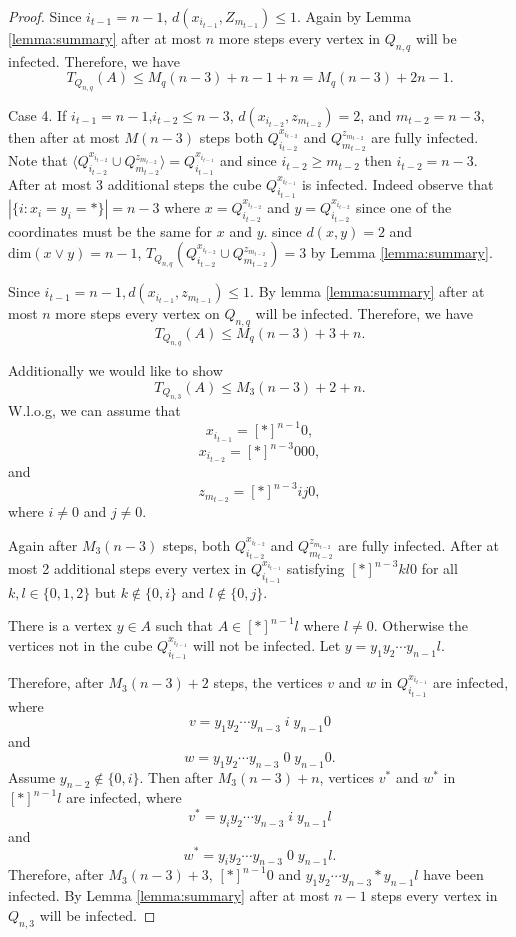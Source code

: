 \documentclass[reqno,11pt]{amsart}
\renewcommand{\leq}{\leqslant}
\renewcommand{\geq}{\geqslant}
\begin{document}
\begin{proof}
Since $i_{t-1}=n-1$, $d(x_{i_{t-1}},Z_{m_{t-1}}) \leq 1$. Again by Lemma \ref{lemma:summary} after at most $n$ more steps every vertex in $Q_{n,q}$ will be infected. Therefore, we have 
$$T_{Q_{n,q}}(A) \leq M_q(n-3)+n-1+n=M_q(n-3)+2n-1.$$

Case 4. If $i_{t-1}=n-1$,$i_{t-2} \leq n-3$, $d(x_{i_{t-2}},z_{m_{t-2}})=2$, and $m_{t-2}=n-3$, then after at most $M(n-3)$ steps both $Q_{i_{t-2}}^{x_{i_{t-2}}}$ and $Q_{m_{t-2}}^{z_{m_{t-2}}}$ are fully infected. Note that $\langle Q_{i_{t-2}}^{x_{i_{t-2}}} \cup Q_{m_{t-2}}^{z_{m_{t-2}}} \rangle=Q_{i_{t-1}}^{x_{i_{t-1}}}$ and since $i_{t-2} \geq m_{t-2}$ then $i_{t-2}=n-3$. After at most 3 additional steps the cube $Q_{i_{t-1}}^{x_{i_{t-1}}}$ is infected. Indeed observe that $|\{i: x_i=y_i=\ast\}| =n-3$ where $x= Q_{i_{t-2}}^{x_{i_{t-2}}}$ and $y= Q_{i_{t-2}}^{x_{i_{t-2}}}$ since one of the coordinates must be the same for $x$ and $y$. since $d(x,y)=2$ and $\text{dim}(x \vee y)=n-1$, $T_{Q_{n,q}}(Q_{i_{t-2}}^{x_{i_{t-2}}} \cup Q_{m_{t-2}}^{z_{m_{t-2}}})=3$ by Lemma \ref{lemma:summary}.

Since $i_{t-1}=n-1, d(x_{i_{t-1}},z_{m_{t-1}}) \leq 1$. By lemma \ref{lemma:summary} after at most $n$ more steps every vertex on $Q_{n,q}$ will be infected. Therefore, we have 
$$T_{Q_{n,q}}(A) \leq M_q(n-3)+3+n.$$

Additionally we would like to show 
$$T_{Q_{n,3}}(A) \leq M_3(n-3)+2+n.$$
W.l.o.g, we can assume that 
$$x_{i_{t-1}}=[\ast]^{n-1}0,$$
$$x_{i_{t-2}}=[\ast]^{n-3}000,$$
and 
$$z_{m_{t-2}}=[\ast]^{n-3}ij0,$$
where $i \neq 0$ and $j \neq 0$.

Again after $M_3(n-3)$ steps, both $Q_{i_{t-2}}^{x_{i_{t-2}}}$ and $Q_{m_{t-2}}^{z_{m_{t-2}}}$ are fully infected. After at most 2 additional steps every vertex in $Q_{i_{t-1}}^{x_{i_{t-1}}}$ satisfying $[\ast]^{n-3}kl0$ for all $k,l\in \{0,1,2\}$ but $k \notin \{0,i\}$ and $l \notin \{0,j\}$. 

There is a vertex $y \in A$ such that $A \in [\ast]^{n-1}l$ where $l \neq 0$. Otherwise the vertices not in the cube $Q_{i_{t-1}}^{x_{i_{t-1}}}$ will not be infected. Let $y=y_1y_2 \cdots y_{n-1}l$.

Therefore, after $M_3(n-3)+2$ steps, the vertices $v$ and $w$ in $Q_{i_{t-1}}^{x_{i_{t-1}}}$ are infected, where 
$$v=y_1y_2\cdots y_{n-3}\;i\;y_{n-1}0$$
and 
$$w=y_1y_2\cdots y_{n-3}\;0\; y_{n-1}0.$$
Assume $y_{n-2} \notin \{0,i\}$. Then after $M_3(n-3)+n$, vertices $v^*$ and $w^*$ in $[\ast]^{n-1}l$ are infected, where 
$$v^*=y_iy_2 \cdots y_{n-3}\;i\;y_{n-1}l$$
and 
$$w^*=y_iy_2 \cdots y_{n-3}\;0\;y_{n-1}l. $$
Therefore, after $M_3(n-3)+3$, $[\ast]^{n-1}0$ and $y_1y_2\cdots y_{n-3}\ast y_{n-1}l$ have been infected. By Lemma \ref{lemma:summary} after at most $n-1$ steps every vertex in $Q_{n,3}$ will be infected. 


\end{proof}
\end{document}

